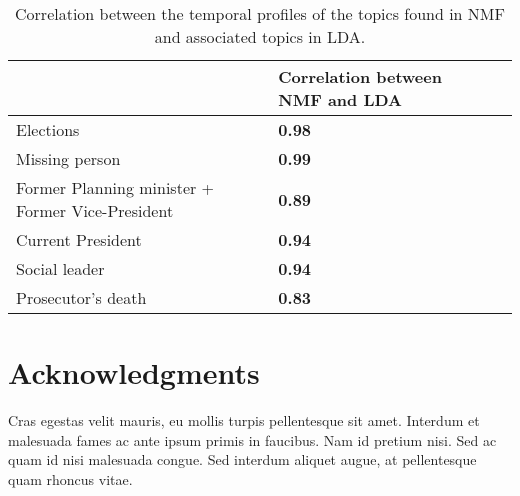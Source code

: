 \documentclass[10pt,letterpaper]{article}
\begin{document}
\begin{table}[h!]
\begin{adjustwidth}{-2.25in}{0in}
{\begin{tabular}{llc}
& Correlation between NMF and LDA \\ \hline
Elections & \textbf{0.98} \\
Missing person & \textbf{0.99} \\
Former Planning minister + Former Vice-President & \textbf{0.89} \\
Current President & \textbf{0.94} \\
Social leader & \textbf{0.94} \\
Prosecutor's death & \textbf{0.83} \\
\end{tabular}}
\caption{Correlation between the temporal profiles of the topics found in NMF and associated topics in LDA.}
\label{table:correlation_nmf_lda}
\end{adjustwidth}
\end{table}

\section*{Acknowledgments}
Cras egestas velit mauris, eu mollis turpis pellentesque sit amet. Interdum et malesuada fames ac ante ipsum primis in faucibus. Nam id pretium nisi. Sed ac quam id nisi malesuada congue. Sed interdum aliquet augue, at pellentesque quam rhoncus vitae.

\nolinenumbers

%
%
% 
\begin{thebibliography}{10}

\end{thebibliography}
\end{document}
